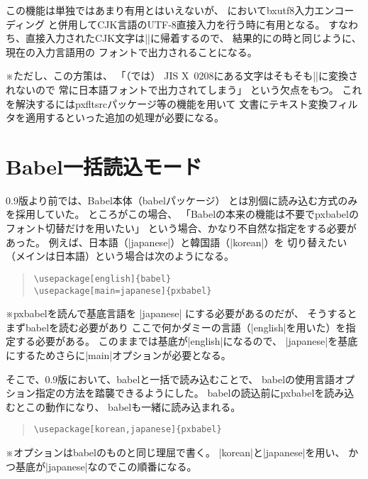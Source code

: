 \documentclass[uplatex,dvipdfmx,a4paper]{jsarticle}
\newcommand{\Pkg}[1]{\textsf{#1}}
\newcommand{\Note}{\par\noindent ※}
\newcommand{\XS}{\hspace{\xkanjiskip}}
\begin{document}
この機能は単独ではあまり有用とはいえないが、
{\pLaTeX}において\Pkg{bxutf8}入力エンコーディング
と併用してCJK言語のUTF-8直接入力を行う時に有用となる。
すなわち、直接入力されたCJK文字は\XS|\UTF|に帰着するので、
結果的に{\upLaTeX}の時と同じように、現在の入力言語用の
フォントで出力されることになる。

\Note ただし、この方策は、
「（{\pLaTeX}では）
JIS X~0208にある文字はそもそも\XS|\UTF|に変換されないので
常に日本語フォントで出力されてしまう」
という欠点をもつ。
これを解決するには\Pkg{pxfltsrc}パッケージ等の機能を用いて
文書にテキスト変換フィルタを適用するといった追加の処理が必要になる。

\section{Babel一括読込モード}
\label{sec:Lumped-Loading}

0.9版より前では、Babel本体（\Pkg{babel}パッケージ）
とは別個に読み込む方式のみを採用していた。
ところがこの場合、
「Babelの本来の機能は不要で\Pkg{pxbabel}の
フォント切替だけを用いたい」
という場合、かなり不自然な指定をする必要があった。
例えば、日本語（|japanese|）と韓国語（|korean|）を
切り替えたい（メインは日本語）という場合は次のようになる。

\begin{quote}\begin{verbatim}
\usepackage[english]{babel}
\usepackage[main=japanese]{pxbabel}
\end{verbatim}\end{quote}
\Note \Pkg{pxbabel}を読んで基底言語を |japanese|
にする必要があるのだが、
そうするとまず\Pkg{babel}を読む必要があり
ここで何かダミーの言語（|english|を用いた）を指定する必要がある。
このままでは基底が|english|になるので、
|japanese|を基底にするためさらに|main|オプションが必要となる。

そこで、0.9版において、\Pkg{babel}と一括で読み込むことで、
\Pkg{babel}の使用言語オプション指定の方法を踏襲できるようにした。
\Pkg{babel}の読込前に\Pkg{pxbabel}を読み込むとこの動作になり、
\Pkg{babel}も一緒に読み込まれる。

\begin{quote}\begin{verbatim}
\usepackage[korean,japanese]{pxbabel}
\end{verbatim}\end{quote}
\Note オプションは\Pkg{babel}のものと同じ理屈で書く。
|korean|と|japanese|を用い、
かつ基底が|japanese|なのでこの順番になる。
\end{document}
